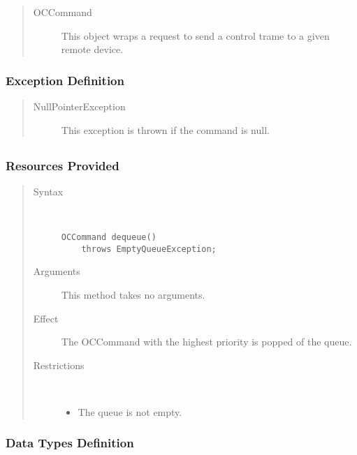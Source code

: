\begin{quote}
	\begin{description}
		\item[OCCommand] This object wraps a request to send a control trame to a
		given remote device.
	\end{description} 
\end{quote}

\subsubsection{Exception Definition}

\begin{quote}
	\begin{description}
		\item[NullPointerException] This exception is thrown if the command is null.
	\end{description} 
\end{quote}

\subsection{}

\subsubsection{Resources Provided}

\begin{quote}
	\begin{description}
		\item[Syntax] \ 
		\begin{verbatim}
OCCommand dequeue() 
    throws EmptyQueueException;
		\end{verbatim}
		\item[Arguments] This method takes no arguments.
		\item[Effect] The OCCommand with the highest priority is popped of the queue.
		\item[Restrictions] \ 
		\begin{itemize}
			\item The queue is not empty. 
		\end{itemize}
	\end{description} 
\end{quote}

\subsubsection{Data Types Definition}

